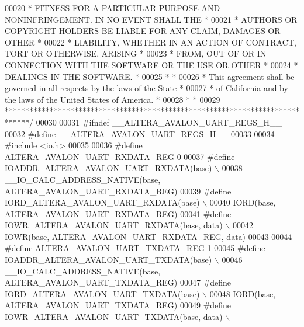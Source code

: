 \begin{DoxyCode}
00020 \textcolor{comment}{* FITNESS FOR A PARTICULAR PURPOSE AND NONINFRINGEMENT. IN NO EVENT SHALL THE *}
00021 \textcolor{comment}{* AUTHORS OR COPYRIGHT HOLDERS BE LIABLE FOR ANY CLAIM, DAMAGES OR OTHER      *}
00022 \textcolor{comment}{* LIABILITY, WHETHER IN AN ACTION OF CONTRACT, TORT OR OTHERWISE, ARISING     *}
00023 \textcolor{comment}{* FROM, OUT OF OR IN CONNECTION WITH THE SOFTWARE OR THE USE OR OTHER         *}
00024 \textcolor{comment}{* DEALINGS IN THE SOFTWARE.                                                   *}
00025 \textcolor{comment}{*                                                                             *}
00026 \textcolor{comment}{* This agreement shall be governed in all respects by the laws of the State   *}
00027 \textcolor{comment}{* of California and by the laws of the United States of America.              *}
00028 \textcolor{comment}{*                                                                             *}
00029 \textcolor{comment}{******************************************************************************/}
00030 
00031 \textcolor{preprocessor}{#ifndef \_\_ALTERA\_AVALON\_UART\_REGS\_H\_\_}
00032 \textcolor{preprocessor}{#define \_\_ALTERA\_AVALON\_UART\_REGS\_H\_\_}
00033 
00034 \textcolor{preprocessor}{#include <io.h>}
00035 
00036 \textcolor{preprocessor}{#define ALTERA\_AVALON\_UART\_RXDATA\_REG                 0}
00037 \textcolor{preprocessor}{#define IOADDR\_ALTERA\_AVALON\_UART\_RXDATA(base)        \(\backslash\)}
00038 \textcolor{preprocessor}{        \_\_IO\_CALC\_ADDRESS\_NATIVE(base, ALTERA\_AVALON\_UART\_RXDATA\_REG)}
00039 \textcolor{preprocessor}{#define IORD\_ALTERA\_AVALON\_UART\_RXDATA(base)          \(\backslash\)}
00040 \textcolor{preprocessor}{        IORD(base, ALTERA\_AVALON\_UART\_RXDATA\_REG) }
00041 \textcolor{preprocessor}{#define IOWR\_ALTERA\_AVALON\_UART\_RXDATA(base, data)    \(\backslash\)}
00042 \textcolor{preprocessor}{        IOWR(base, ALTERA\_AVALON\_UART\_RXDATA\_REG, data)}
00043 
00044 \textcolor{preprocessor}{#define ALTERA\_AVALON\_UART\_TXDATA\_REG                 1}
00045 \textcolor{preprocessor}{#define IOADDR\_ALTERA\_AVALON\_UART\_TXDATA(base)        \(\backslash\)}
00046 \textcolor{preprocessor}{        \_\_IO\_CALC\_ADDRESS\_NATIVE(base, ALTERA\_AVALON\_UART\_TXDATA\_REG)}
00047 \textcolor{preprocessor}{#define IORD\_ALTERA\_AVALON\_UART\_TXDATA(base)          \(\backslash\)}
00048 \textcolor{preprocessor}{        IORD(base, ALTERA\_AVALON\_UART\_TXDATA\_REG)}
00049 \textcolor{preprocessor}{#define IOWR\_ALTERA\_AVALON\_UART\_TXDATA(base, data)    \(\backslash\)}

\end{DoxyCode}
